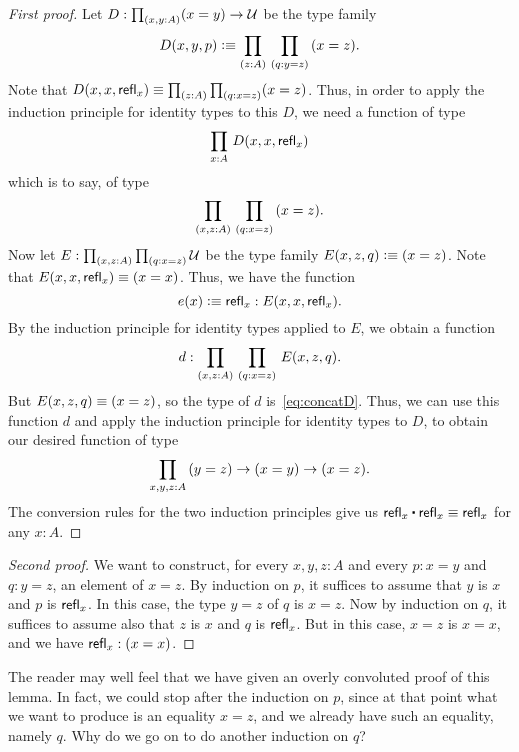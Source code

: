 \begin{proof}[First proof]
  Let $D:\prd{x,y:A} (x=y) \to \type$ be the type family
  \begin{equation*}
    D(x,y,p)\defeq \prd{z:A}{q:y=z} (x=z).
  \end{equation*}
  Note that $D(x,x,\refl x) \jdeq \prd{z:A}{q:x=z} (x=z)$.
  Thus, in order to apply the induction principle for identity types to this $D$, we need a function of type
  \begin{equation}\label{eq:concatD}
    \prd{x:A} D(x,x,\refl{x})
  \end{equation}
  which is to say, of type
  \[ \prd{x,z:A}{q:x=z} (x=z). \]
  Now let $E:\prd{x,z:A}{q:x=z}\type$ be the type family $E(x,z,q)\vcentcolon\equiv (x=z)$.
  Note that $E(x,x,\mathsf{refl}_{x}) \equiv (x=x)$.
  Thus, we have the function
  \begin{equation*}
    e(x) \vcentcolon\equiv \mathsf{refl}_{x} : E(x,x,\mathsf{refl}_{x}).
  \end{equation*}
  By the induction principle for identity types applied to $E$, we obtain a function
  \begin{equation*}
    d : \prd{x,z:A}{q:x=z} E(x,z,q).
  \end{equation*}
  But $E(x,z,q)\equiv (x=z)$, so the type of $d$ is~\eqref{eq:concatD}.
  Thus, we can use this function $d$ and apply the induction principle for identity types to $D$, to obtain our desired function of type
  \begin{equation*}
    \prd{x,y,z:A} (y=z) \to (x=y) \to (x=z).
  \end{equation*}
  The conversion rules for the two induction principles give us $\refl{x}\ct \refl{x}\jdeq \refl{x}$ for any $x:A$.
\end{proof}

\begin{proof}[Second proof]
  We want to construct, for every $x,y,z:A$ and every $p:x=y$ and $q:y=z$, an element of $x=z$.
  By induction on $p$, it suffices to assume that $y$ is $x$ and $p$ is $\mathsf{refl}_{x}$.
  In this case, the type $y=z$ of $q$ is $x=z$.
  Now by induction on $q$, it suffices to assume also that $z$ is $x$ and $q$ is $\mathsf{refl}_{x}$.
  But in this case, $x=z$ is $x=x$, and we have $\mathsf{refl}_{x}:(x=x)$.
\end{proof}

The reader may well feel that we have given an overly convoluted proof of this lemma.
In fact, we could stop after the induction on $p$, since at that point what we want to produce is an equality $x=z$, and we already have such an equality, namely $q$.
Why do we go on to do another induction on $q$?

